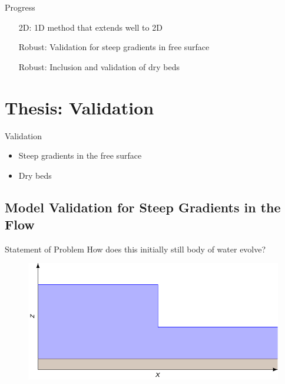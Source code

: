 \documentclass[]{beamer}
\begin{document}
\begin{frame}{Progress}
	\begin{itemize}
		\item[2D:] 1D method that extends well to 2D \checkmark
		\item[Robust:] Validation for steep gradients in free surface
		\item[Robust:] Inclusion and validation of dry beds
	\end{itemize}	
\end{frame}

\section{Thesis: Validation}
\begin{frame}{Validation}
	\begin{itemize}
		\item Steep gradients in the free surface
		\item Dry beds
	\end{itemize}
\end{frame}


\subsection{ Model Validation for Steep Gradients in the Flow}
\begin{frame}{Statement of Problem}
	How does this initially still body of water evolve?
	\begin{figure}
		\includegraphics[width=\textwidth]{./Pics/SteepGradients/Wavetank.pdf}
	\end{figure}
\end{frame}	
\end{document}
